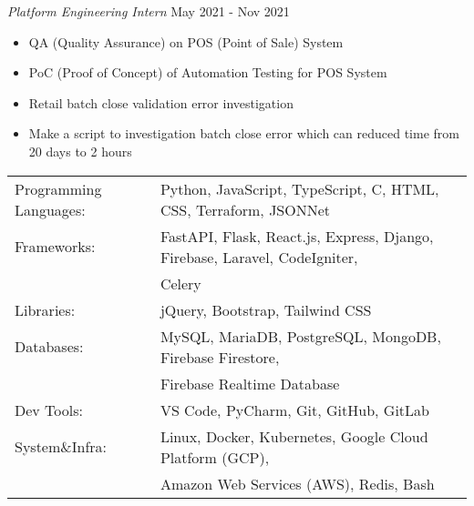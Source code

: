 \textit{Platform Engineering Intern} \hfill May 2021 - Nov 2021\\
\vspace{-1mm}
\begin{itemize}
	\item QA (Quality Assurance) on POS (Point of Sale) System
	\item PoC (Proof of Concept) of Automation Testing for POS System
	\item Retail batch close validation error investigation
	\item Make a script to investigation batch close error which can reduced time from 20 days to 2 hours
\end{itemize}

\begin{tabular}{ l l }
	Programming Languages: & Python, JavaScript, TypeScript, C, HTML, CSS, Terraform, JSONNet                         \\
	Frameworks:            & FastAPI, Flask, React.js, Express, Django, Firebase, Laravel, CodeIgniter,  \\ & Celery        \\
	Libraries:             & jQuery, Bootstrap, Tailwind CSS                                                          \\
	Databases:             & MySQL, MariaDB, PostgreSQL, MongoDB, Firebase Firestore, \\ & Firebase Realtime Database      \\
	Dev Tools:             & VS Code, PyCharm, Git, GitHub, GitLab                                                    \\
	System\&Infra:         & Linux, Docker, Kubernetes, Google Cloud Platform (GCP), \\ & Amazon Web Services (AWS), Redis, Bash \\
\end{tabular}
\vspace{2mm}

